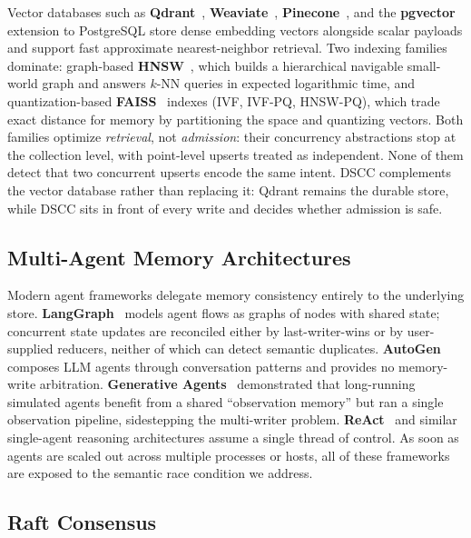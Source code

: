 \documentclass[sigconf]{acmart}
\begin{document}
Vector databases such as \textbf{Qdrant}~\cite{qdrant},
\textbf{Weaviate}~\cite{weaviate}, \textbf{Pinecone}~\cite{pinecone}, and the
\textbf{pgvector}~\cite{pgvector} extension to PostgreSQL store dense
embedding vectors alongside scalar payloads and support fast approximate
nearest-neighbor retrieval. Two indexing families dominate: graph-based
\textbf{HNSW}~\cite{hnswlib}, which builds a hierarchical navigable
small-world graph and answers $k$-NN queries in expected logarithmic time,
and quantization-based \textbf{FAISS}~\cite{faiss} indexes (IVF, IVF-PQ,
HNSW-PQ), which trade exact distance for memory by partitioning the space
and quantizing vectors. Both families optimize \emph{retrieval}, not
\emph{admission}: their concurrency abstractions stop at the collection
level, with point-level upserts treated as independent. None of them detect
that two concurrent upserts encode the same intent. DSCC complements the
vector database rather than replacing it: Qdrant remains the durable
store, while DSCC sits in front of every write and decides whether
admission is safe.

\subsection{Multi-Agent Memory Architectures}
\label{sec:bg-agents}

Modern agent frameworks delegate memory consistency entirely to the
underlying store. \textbf{LangGraph}~\cite{langgraph} models agent flows as
graphs of nodes with shared state; concurrent state updates are reconciled
either by last-writer-wins or by user-supplied reducers, neither of which
can detect semantic duplicates. \textbf{AutoGen}~\cite{autogen} composes
LLM agents through conversation patterns and provides no memory-write
arbitration. \textbf{Generative Agents}~\cite{park2023generative}
demonstrated that long-running simulated agents benefit from a shared
``observation memory'' but ran a single observation pipeline, sidestepping
the multi-writer problem. \textbf{ReAct}~\cite{yao2023react} and similar
single-agent reasoning architectures assume a single thread of control. As
soon as agents are scaled out across multiple processes or hosts, all
of these frameworks are exposed to the semantic race condition we address.

\subsection{Raft Consensus}
\label{sec:bg-raft}
\end{document}

